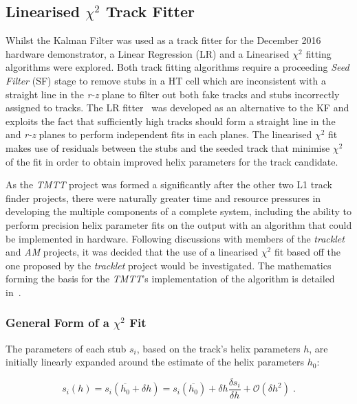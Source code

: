 \subsection{Linearised $\chi^{2}$ Track Fitter}\label{subsec:chi2}
Whilst the Kalman Filter was used as a track fitter for the December 2016 hardware demonstrator, a Linear Regression (LR) and a Linearised $\chi^{2}$ fitting algorithms were explored.
Both track fitting algorithms require a proceeding \emph{Seed Filter} (SF) stage to remove stubs in a HT cell which are inconsistent with a straight line in the \emph{r-z} plane to filter out both fake tracks and stubs incorrectly assigned to tracks.
The LR fitter~\cite{TMTT_FLP} was developed as an alternative to the KF and exploits the fact that sufficiently high \pT tracks should form a straight line in the \emph{\rphi} and \emph{r-z} planes to perform independent fits in each planes.
The linearised $\chi^{2}$ fit makes use of residuals between the stubs and the seeded track that minimise $\chi^{2}$ of the fit in order to obtain improved helix parameters for the track candidate.

As the \emph{TMTT} project was formed a significantly after the other two L1 track finder projects, there were naturally greater time and resource pressures in developing the multiple components of a complete system, including the ability to perform precision helix parameter fits on the \HT output with an algorithm that could be  implemented in hardware. 
Following discussions with members of the \emph{tracklet} and \emph{AM} projects, it was decided that the use of a linearised $\chi^{2}$ fit based off the one proposed by the \emph{tracklet} project would be investigated.
The mathematics forming the basis for the \emph{TMTT}'s implementation of the algorithm is detailed in~\cite{CMS_DN-14-043}. 

\subsubsection{General Form of a $\chi^{2}$ Fit}\label{subsubsec:chi2maths}
The parameters of each stub $s_{i}$, based on the track’s helix parameters $h$, are initially linearly expanded around the estimate of the helix parameters $h_{0}$:

\begin{equation}
s_{i}(h) = s_{i}(\overline{h_{0}} + \delta h) = s_{i}(\overline{h_{0}}) + \delta h \frac{\delta s_{i}}{\delta h} + \mathcal{O}(\delta h^{2}) \;.
\label{eq:chi1}
\end{equation}

